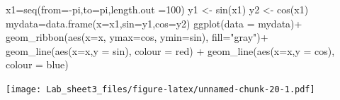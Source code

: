 \documentclass[
]{article}
\newenvironment{Shaded}{\begin{snugshade}}{\end{snugshade}}
\newcommand{\AttributeTok}[1]{\textcolor[rgb]{0.77,0.63,0.00}{#1}}
\newcommand{\DecValTok}[1]{\textcolor[rgb]{0.00,0.00,0.81}{#1}}
\newcommand{\FunctionTok}[1]{\textcolor[rgb]{0.00,0.00,0.00}{#1}}
\newcommand{\NormalTok}[1]{#1}
\newcommand{\OtherTok}[1]{\textcolor[rgb]{0.56,0.35,0.01}{#1}}
\newcommand{\SpecialCharTok}[1]{\textcolor[rgb]{0.00,0.00,0.00}{#1}}
\newcommand{\StringTok}[1]{\textcolor[rgb]{0.31,0.60,0.02}{#1}}
\theoremstyle{remark}
\begin{document}
\begin{Shaded}
\begin{Highlighting}[]
\NormalTok{x1}\OtherTok{=}\FunctionTok{seq}\NormalTok{(}\AttributeTok{from=}\SpecialCharTok{{-}}\NormalTok{pi,}\AttributeTok{to=}\NormalTok{pi,}\AttributeTok{length.out =}\DecValTok{100}\NormalTok{)}
\NormalTok{y1 }\OtherTok{\textless{}{-}} \FunctionTok{sin}\NormalTok{(x1) }
\NormalTok{y2 }\OtherTok{\textless{}{-}} \FunctionTok{cos}\NormalTok{(x1)}
\NormalTok{mydata}\OtherTok{=}\FunctionTok{data.frame}\NormalTok{(}\AttributeTok{x=}\NormalTok{x1,}\AttributeTok{sin=}\NormalTok{y1,}\AttributeTok{cos=}\NormalTok{y2)}
\FunctionTok{ggplot}\NormalTok{(}\AttributeTok{data =}\NormalTok{ mydata)}\SpecialCharTok{+}
\FunctionTok{geom\_ribbon}\NormalTok{(}\FunctionTok{aes}\NormalTok{(}\AttributeTok{x=}\NormalTok{x, }\AttributeTok{ymax=}\NormalTok{cos, }\AttributeTok{ymin=}\NormalTok{sin), }\AttributeTok{fill=}\StringTok{"gray"}\NormalTok{)}\SpecialCharTok{+}
\FunctionTok{geom\_line}\NormalTok{(}\FunctionTok{aes}\NormalTok{(}\AttributeTok{x=}\NormalTok{x,}\AttributeTok{y =}\NormalTok{ sin), }\AttributeTok{colour =} \StringTok{\textquotesingle{}red\textquotesingle{}}\NormalTok{) }\SpecialCharTok{+}
\FunctionTok{geom\_line}\NormalTok{(}\FunctionTok{aes}\NormalTok{(}\AttributeTok{x=}\NormalTok{x,}\AttributeTok{y =}\NormalTok{ cos), }\AttributeTok{colour =} \StringTok{\textquotesingle{}blue\textquotesingle{}}\NormalTok{)}
\end{Highlighting}
\end{Shaded}

\texttt{[image: Lab\_sheet3\_files/figure-latex/unnamed-chunk-20-1.pdf]}
\end{document}
